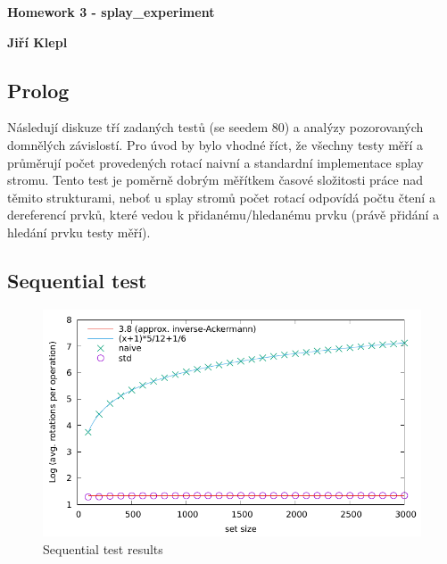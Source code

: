 \documentclass[a4paper,12pt]{article} %
\begin{document}
\thispagestyle{empty} %

\begin{center}
	{\Large \bf Homework 3 - splay\_experiment}
	\vspace{2mm}
	
	{\bf Jiří Klepl}
		
\end{center}  

\vspace{0.4cm}


\setlength{\parindent}{2em}

\subsection*{Prolog}

Následují diskuze tří zadaných testů (se seedem 80) a analýzy pozorovaných domnělých závislostí. Pro úvod by bylo vhodné říct, že všechny testy měří a průměrují počet provedených rotací naivní a standardní implementace splay stromu. Tento test je poměrně dobrým měřítkem časové složitosti práce nad těmito strukturami, neboť u splay stromů počet rotací odpovídá počtu čtení a dereferencí prvků, které vedou k přidanému/hledanému prvku (právě přidání a hledání prvku testy měří).

\subsection*{Sequential test}

\begin{figure}[!htb]
    \caption{Sequential test results}
    \label{seq_results}
    \includegraphics{sequential.pdf}    
\end{figure}
\end{document}

